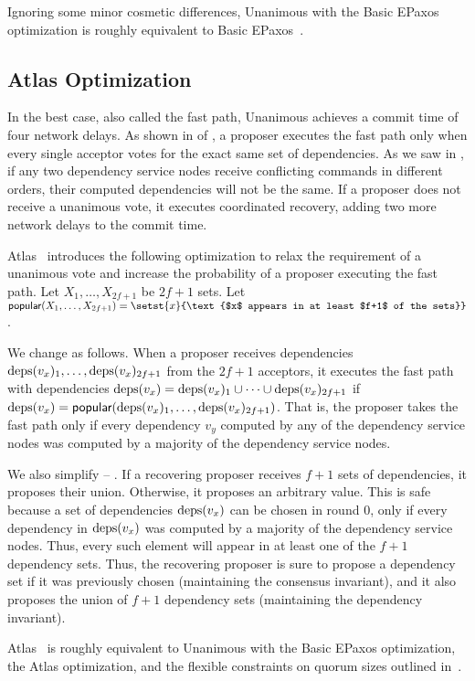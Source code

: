 Ignoring some minor cosmetic differences, Unanimous \BPaxos{} with the Basic
EPaxos optimization is roughly equivalent to Basic
EPaxos~\cite{moraru2013there}.

\subsection{Atlas Optimization}
In the best case, also called the fast path, Unanimous \BPaxos{} achieves a
commit time of four network delays. As shown in  of
, a proposer executes the fast path only when
every single acceptor votes for the exact same set of dependencies. As we saw
in , if any two dependency service nodes receive
conflicting commands in different orders, their computed dependencies will not
be the same. If a proposer does not receive a unanimous vote, it executes
coordinated recovery, adding two more network delays to the commit time.

\newcommand{\popular}[1]{\textsf{popular}(#1)}
Atlas~\cite{enes2020state} introduces the following optimization to relax the
requirement of a unanimous vote and increase the probability of a proposer
executing the fast path. Let $X_1, \ldots, X_{2f+1}$ be $2f+1$ sets. Let
$\popular{X_1, \ldots, X_{2f+1}} = \setst{x}{\text{$x$ appears in at least
$f+1$ of the sets}}$.

We change  as follows. When a proposer receives
dependencies $\text{deps}(v_x)_1, \ldots, \text{deps}(v_x)_{2f+1}$ from the $2f+1$
acceptors, it executes the fast path with dependencies $\text{deps}(v_x) =
\text{deps}(v_x)_1 \cup \cdots \cup \text{deps}(v_x)_{2f+1}$ if $\deps{v_x} =
\popular{\deps{v_x}_1, \ldots, \deps{v_x}_{2f+1}}$. That is, the proposer takes
the fast path only if every dependency $v_y$ computed by any of the dependency
service nodes was computed by a majority of the dependency service nodes.

We also simplify  -- . If a
recovering proposer receives $f+1$ sets of dependencies, it proposes their
union. Otherwise, it proposes an arbitrary value. This is safe because a set of
dependencies $\text{deps}(v_x)$ can be chosen in round $0$, only if every dependency
in $\text{deps}(v_x)$ was computed by a majority of the dependency service nodes.
Thus, every such element will appear in at least one of the $f+1$ dependency
sets. Thus, the recovering proposer is sure to propose a dependency set if it
was previously chosen (maintaining the consensus invariant), and it also
proposes the union of $f+1$ dependency sets (maintaining the dependency
invariant).

Atlas~\cite{enes2020state} is roughly equivalent to Unanimous \BPaxos{} with
the Basic EPaxos optimization, the Atlas optimization, and the flexible
constraints on quorum sizes outlined in~\cite{howard2021fast}.
